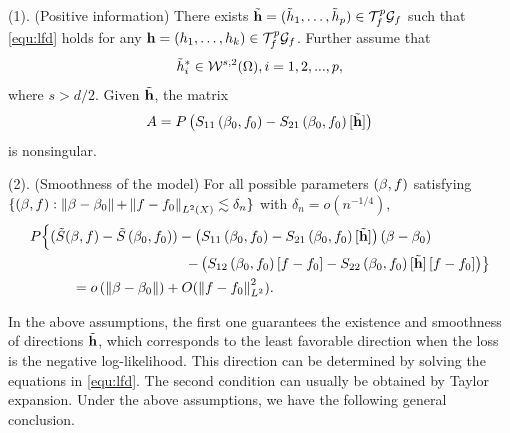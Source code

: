 \begin{assumption}\label{ass:semi} 
(1). (Positive information) There exists $\tilde{\mathbf{h}}=(\tilde{h}_1, \ldots, \tilde{h}_p) \in \mathcal{T}_{f}^p\mathcal{G}_{f}$ such that \eqref{equ:lfd} holds for any $\mathbf{h}=\left(h_1, \ldots, h_k\right) \in \mathcal{T}_{f}^p\mathcal{G}_{f}$. Further assume that 
$$
\tilde{h}_i^* \in \mathcal{W}^{s,2}(\Omega), i=1,2,...,p, 
$$
where $s>d/2$. Given $\tilde{\mathbf{h}}$, the matrix 
$$
\begin{aligned}
A = P\left(S_{11}\left(\beta_{0}, f_{0}\right)-S_{21}\left(\beta_{0}, f_{0}\right) [\tilde{\mathbf{h}} ]\right)
\end{aligned}
$$
is nonsingular. 

(2). (Smoothness of the model) For all possible parameters $(\beta, f)$ satisfying $\{(\beta, f):\left\|\beta-\beta_{0}\right\|$$+ \left\|f-f_{0} \right\|_{L^2(X)} \lesssim \delta_n \}$ with $ \delta_n = o(n^{-1/4})$, 
$$
\begin{aligned}
    & P \Big\{(\tilde{S}(\beta, f)-\tilde{S}\left(\beta_{0}, f_{0}\right))-\left(S_{11}\left(\beta_{0}, f_{0}\right)-S_{21}\left(\beta_{0}, f_{0}\right)[\tilde{\mathbf{h}} ]\right)\left(\beta-\beta_{0}\right) \\
&\quad \quad \quad \quad \quad \quad \quad \quad \quad \quad \quad \left.-\left(S_{12}\left(\beta_{0}, f_{0}\right)\left[f-f_{0} \right]-S_{22}\left(\beta_{0}, f_{0}\right)[\tilde{\mathbf{h}} ]\left[f-f_{0}\right]\right)\right\}\\
&\quad \quad \quad =o\left(\left\|\beta-\beta_{0}\right\|\right)+O(\left\|f-f_{0} \right\|_{L^2}^{2}) .
\end{aligned}
$$

\end{assumption}

In the above assumptions, the first one guarantees the existence and smoothness of directions $\tilde{\mathbf{h}}$, which corresponds to the least favorable direction when the loss is the negative log-likelihood. 
This direction can be determined by solving the equations in \eqref{equ:lfd}.
The second condition can usually be obtained by Taylor expansion. 
Under the above assumptions, we have the following general conclusion. 



